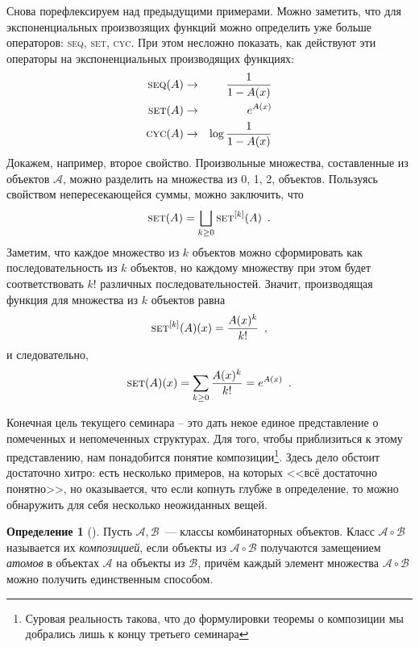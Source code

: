 \documentclass{article}
\theoremstyle{definition}
\newtheorem*{definition}{Определение}
\begin{document}
Снова порефлексируем над предыдущими примерами. Можно заметить, что для 
экспоненциальных произвозящих функций можно определить уже больше операторов: 
\textsc{seq}, \textsc{set}, \textsc{cyc}. При этом несложно показать, как 
действуют эти операторы на экспоненциальных производящих функциях:
\begin{eqnarray*}
	\text{\textsc{seq}}(A) &\to& \dfrac{1}{1 - A(x)} \\
	\text{\textsc{set}}(A) &\to& e^{A(x)} \\
	\text{\textsc{cyc}}(A) &\to& \log \dfrac{1}{1 - A(x)} \\	
\end{eqnarray*}
Докажем, например, второе свойство. Произвольные множества, составленные из 
объектов \( \mathcal A \), можно разделить на множества из 0, 1, 2, объектов. 
Пользуясь свойством непересекающейся суммы, можно заключить, что
\[
	\text{\textsc{set}}(A) = \bigsqcup_{k \geq 0} \text{\textsc{set}}^{[k]}(A) 
	\enspace .
\]
Заметим, что каждое множество из \( k \) объектов можно сформировать как 
последовательность из \( k \) объектов, но каждому множеству при этом будет 
соответствовать \( k! \) различных последовательностей. Значит, производящая 
функция для множества из \( k \) объектов равна
\[
	\text{\textsc{set}}^{[k]}(A)(x) = \dfrac{A(x)^{k}}{k!} \enspace ,
\]
и следовательно,
\[
	\text{\textsc{set}}(A)(x) = \sum_{k \geq 0} \dfrac{A(x)^{k}}{k!} = e^{A(x)} 
	\enspace .
\]

Конечная цель текущего семинара -- это дать некое единое представление о 
помеченных и непомеченных структурах. Для того, чтобы приблизиться к этому 
представлению, нам понадобится понятие композиции\footnote{Суровая реальность такова, что до формулировки теоремы о композиции мы добрались лишь к концу третьего семинара}. Здесь дело обстоит 
достаточно хитро: есть несколько примеров, на которых <<всё достаточно 
понятно>>, но оказывается, что если копнуть глубже в определение, то можно 
обнаружить для себя несколько неожиданных вещей.

\begin{definition}[{\cite[Определение 2.2.20, с.49]{gouldenjackson}}]
	Пусть \( \mathcal A, \mathcal B \)~--- классы комбинаторных объектов. Класс 
	\( \mathcal A \circ \mathcal B \) называется их \textit{композицией}, если 
	объекты из \( \mathcal A \circ \mathcal B \) получаются замещением 
	\textit{атомов} в объектах \( \mathcal A \) на объекты из \( \mathcal B \), 
	причём каждый элемент множества \( \mathcal A \circ \mathcal B \) можно 
	получить единственным способом.
\end{definition}
\end{document}
